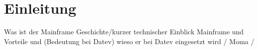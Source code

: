 \chapter{Einleitung}\label{ch:einleitung}

Was ist der Mainframe
Geschichte/kurzer technischer Einblick Mainframe und Vorteile und (Bedeutung bei Datev) wieso er bei Datev eingesetzt wird / Moma /